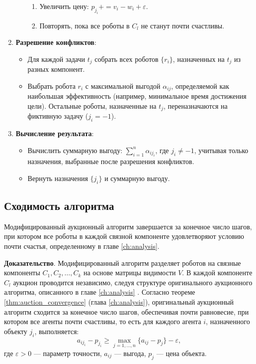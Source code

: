 \begin{enumerate}
\begin{itemize}
\begin{enumerate}
            \item Увеличить цену: \( p_{j_i} += v_i - w_i + \varepsilon \).
            \item Повторять, пока все роботы в \( C_l \) не станут почти счастливы.
        \end{enumerate}
    \end{itemize}
    \item \textbf{Разрешение конфликтов}:
    \begin{itemize}
        \item Для каждой задачи \( t_j \) собрать всех роботов \( \{r_i\} \), назначенных на \( t_j \) из разных компонент.
        \item Выбрать робота \( r_i \) с максимальной выгодой \( \alpha_{ij} \), определяемой как наибольшая эффективность (например, минимальное время достижения цели). Остальные роботы, назначенные на \( t_j \), переназначаются на фиктивную задачу (\( j_i = -1 \)).
    \end{itemize}
    \item \textbf{Вычисление результата}:
    \begin{itemize}
        \item Вычислить суммарную выгоду: \( \sum_{i=1}^n \alpha_{i j_i} \), где \( j_i \neq -1 \), учитывая только назначения, выбранные после разрешения конфликтов.
        \item Вернуть назначения \( \{j_i\} \) и суммарную выгоду.
    \end{itemize}
\end{enumerate}


\subsection{Сходимость алгоритма}

\begin{theorem}
\label{thm:mod_auction_convergence}
Модифицированный аукционный алгоритм завершается за конечное число шагов, при котором все роботы в каждой связной компоненте удовлетворяют условию почти счастья, определенному в главе \ref{ch:analysis}.
\end{theorem}

\textbf{Доказательство}. 
Модифицированный алгоритм разделяет роботов на связные компоненты \( C_1, C_2, \ldots, C_k \) на основе матрицы видимости \( V \). В каждой компоненте \( C_l \) аукцион проводится независимо, следуя структуре оригинального аукционного алгоритма, описанного в главе \ref{ch:analysis} \cite{bertsekas1990}. Согласно теореме \ref{thm:auction_convergence} (глава \ref{ch:analysis}), оригинальный аукционный алгоритм сходится за конечное число шагов, обеспечивая почти равновесие, при котором все агенты почти счастливы, то есть для каждого агента \( i \), назначенного объекту \( j_i \), выполняется:
\[
a_{i j_i} - p_{j_i} \geq \max_{j=1,\ldots,n} \{a_{ij} - p_j\} - \varepsilon,
\]
где \( \varepsilon > 0 \) — параметр точности, \( a_{ij} \) — выгода, \( p_j \) — цена объекта.

